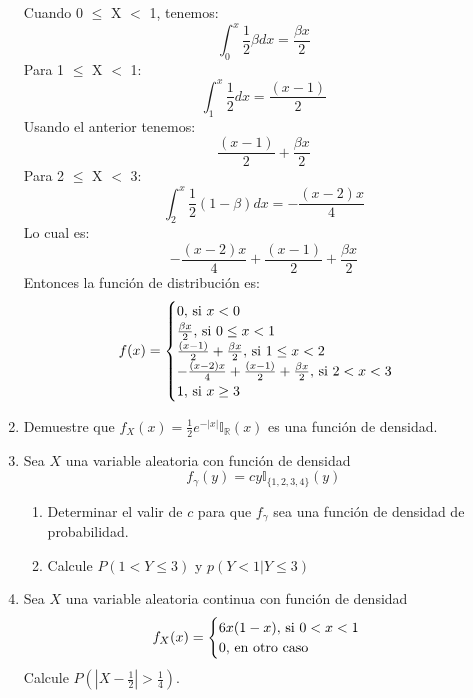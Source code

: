 \documentclass[12pt,a4paper]{report}
\begin{document}
\begin{enumerate}
{			Cuando 0 $\leq$ X $<$ 1, tenemos:
		    \[\int_{0}^{x} \frac{1}{2}\beta dx = \frac{\beta x}{2}\]
		    Para 1 $\leq$ X $<$ 1:
		    \[\int_{1}^{x} \frac{1}{2}dx = \frac{(x-1)}{2}\]
		    Usando el anterior tenemos:
		    \[\frac{(x-1)}{2} +  \frac{\beta x}{2} \]
		    Para 2 $\leq$ X $<$ 3:
		     \[\int_{2}^{x}\frac{1}{2}(1-\beta)dx = -\frac{(x-2)x}{4}\]
		     Lo cual es:
		     \[-\frac{(x-2)x}{4} + \frac{(x-1)}{2} +  \frac{\beta x}{2}\]
		     Entonces la función de distribución es:
		     	\[
				f(x) = \begin{cases}
								0, $ si $ x < 0\\
								\frac{\beta x}{2}, $ si $ 0 \leq x < 1\\
								\frac{(x-1)}{2} +  \frac{\beta x}{2}, $ si $ 1 \leq x < 2\\
								-\frac{(x-2)x}{4} + \frac{(x-1)}{2} +  \frac{\beta x}{2}, $ si $ 2 < x < 3\\
								1, $ si $ x \geq 3
						 	 \end{cases}
			\]
		}
		
		\item {
			Demuestre que $f_X(x) = \frac{1}{2}e^{-|x|}\mathbb{I}_\mathbb{R}(x)$ es
			una función de densidad.
		}
		
		\item {
			Sea $X$ una variable aleatoria con función de densidad
				\[f_\gamma(y) = cy \mathbb{I}_{\{1, 2, 3, 4\}}(y)\]
				\begin{enumerate}
					\item {
						Determinar el valir de $c$ para que $f_\gamma$ sea una función de
						densidad de probabilidad.
					}
					\item {
						Calcule $P(1 < Y \leq 3)$ y $p(Y < 1 | Y \leq 3)$
					}
				\end{enumerate}
		}
		
		\item {
			Sea $X$ una variable aleatoria continua con función de densidad
				\[
					f_X(x) = \begin{cases}
										6x(1-x), $ si $ 0 < x < 1\\
										0, $ en otro caso$
									 \end{cases}
				\]
			Calcule $P(|X-\frac{1}{2}| > \frac{1}{4})$.
		}
		

\end{enumerate}
\end{document}
